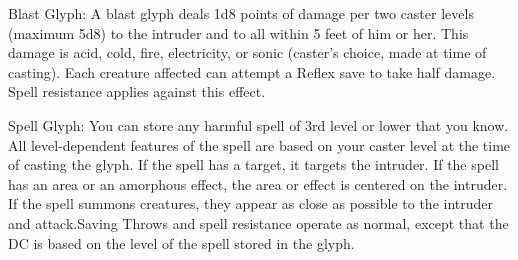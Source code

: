 {Blast Glyph: A blast glyph deals 1d8 points of damage per two caster levels (maximum 5d8) to the intruder and to all within 5 feet of him or her. This damage is acid, cold, fire, electricity, or sonic (caster's choice, made at time of casting). Each creature affected can attempt a Reflex save to take half damage. Spell resistance applies against this effect.

Spell Glyph: You can store any harmful spell of 3rd level or lower that you know. All level-dependent features of the spell are based on your caster level at the time of casting the glyph. If the spell has a target, it targets the intruder. If the spell has an area or an amorphous effect, the area or effect is centered on the intruder. If the spell summons creatures, they appear as close as possible to the intruder and attack.Saving Throws and spell resistance operate as normal, except that the DC is based on the level of the spell stored in the glyph.}
        

